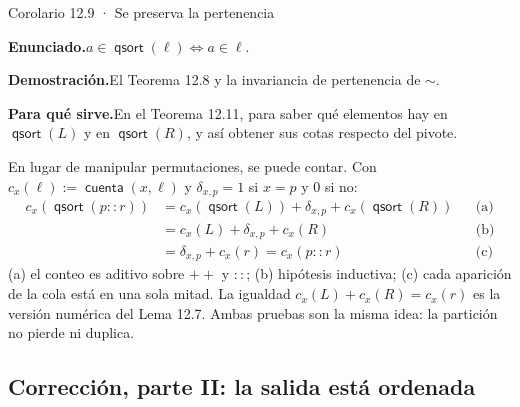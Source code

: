 \documentclass[11pt,a4paper]{article}
\newcommand{\campo}[1]{\par\smallskip\noindent\textbf{#1}\enspace}
\newcommand{\enunciado}{\campo{Enunciado.}}
\newcommand{\sirve}{\campo{Para qué sirve.}}
\newcommand{\prueba}{\campo{Demostración.}}
\newcommand{\Perm}{\sim}
\newcommand{\concat}{\mathbin{+\!\!+}}
\newcommand{\qs}{\operatorname{\mathsf{qsort}}}
\newcommand{\cuenta}{\operatorname{\mathsf{cuenta}}}
\begin{document}
\begin{resultado}{Corolario 12.9 · Se preserva la pertenencia}
\enunciado \(a\in\qs(\ell)\iff a\in\ell\).

\prueba El Teorema 12.8 y la invariancia de pertenencia de \(\Perm\).

\sirve En el Teorema 12.11, para saber qué elementos hay en \(\qs(L)\) y en
\(\qs(R)\), y así obtener sus cotas respecto del pivote.
\end{resultado}

\begin{nota}
En lugar de manipular permutaciones, se puede contar. Con
\(c_x(\ell):=\cuenta(x,\ell)\) y \(\delta_{x,p}=1\) si \(x=p\) y \(0\) si no:
\[
\begin{aligned}
c_x(\qs(p::r))&=c_x(\qs(L))+\delta_{x,p}+c_x(\qs(R)) &&\text{(a)}\\
&=c_x(L)+\delta_{x,p}+c_x(R) &&\text{(b)}\\
&=\delta_{x,p}+c_x(r)=c_x(p::r) &&\text{(c)}
\end{aligned}
\]
(a) el conteo es aditivo sobre \(\concat\) y \(::\); (b) hipótesis
inductiva; (c) cada aparición de la cola está en una sola mitad.
La igualdad \(c_x(L)+c_x(R)=c_x(r)\) es la versión numérica del Lema 12.7.
Ambas pruebas son la misma idea: la partición no pierde ni duplica.
\end{nota}

\subsection{Corrección, parte II: la salida está ordenada}
\end{document}

